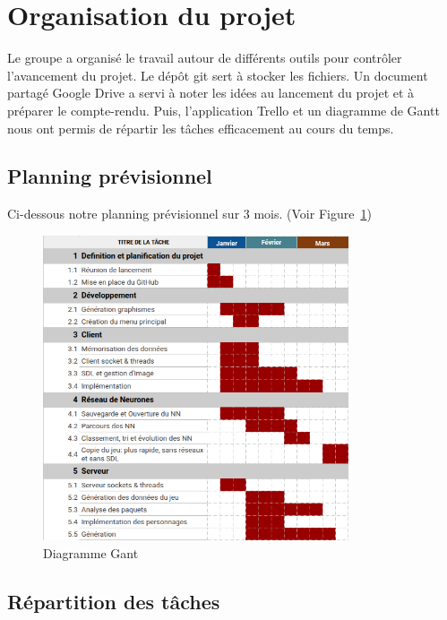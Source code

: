 \documentclass[11pt]{article}
\begin{document}
    \section{Organisation du projet}
    Le groupe a organisé le travail autour de différents outils pour contrôler l’avancement du projet. Le dépôt git sert à stocker les fichiers. Un document partagé Google Drive a servi à noter les idées au lancement du projet et à préparer le compte-rendu. Puis, l’application Trello et un diagramme de Gantt nous ont permis de répartir les tâches efficacement au cours du temps.

        \subsection{Planning prévisionnel}
        Ci-dessous notre planning prévisionnel sur 3 mois. (Voir Figure~\ref{fig:Gant})
        \begin{figure}[H]
            \begin{center}
                \includegraphics[height=9cm]{gant.png}
                \caption{Diagramme Gant}
                \label{fig:Gant} 
            \end{center}
        \end{figure}
        \subsection{Répartition des tâches}
\end{document}
